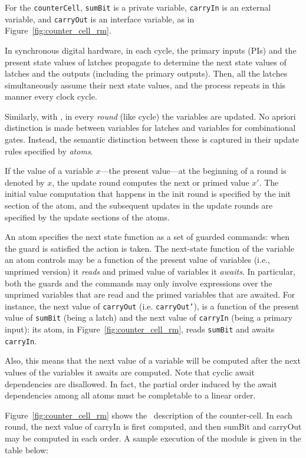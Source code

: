 For the {\tt counterCell}, {\tt sumBit} is a private variable, {\tt carryIn} is an
external variable, and {\tt carryOut} is an interface variable, as in Figure~\ref{fig:counter_cell_rm}. 

In synchronous digital hardware, in each cycle, the primary inputs
(PIs) and the present state values of latches propagate to determine
the next state values of latches and the outputs (including the
primary outputs). Then, all the latches simultaneously assume their
next state values, and the process repeats in this manner every clock cycle. 

Similarly, with \rem, in every {\em round} (like cycle) the variables
are updated. No apriori distinction is made between variables for
latches and variables for combinational gates. Instead, the semantic
distinction between these is captured in their update rules specified
by {\em atoms}. 

If the value of a variable $x$---the present value---at the beginning
of a round is denoted by $x$, the update round computes the next or
primed value $x'$. The initial value computation that happens in the
init round is specified by the init section of the atom, and the
subsequent updates in the update rounds are specified by the update
sections of the atoms.

An atom specifies the next state function as a set of guarded
commands: when the guard is satisfied the action is taken.  The
next-state function of the variable an atom controls may be a function
of the present value of variables (i.e., unprimed version) it {\em
reads} and primed value of variables it {\em awaits}. In particular,
both the guards and the commands may only involve expressions over the
unprimed variables that are read and the primed variables that are
awaited.  For instance, the next value of {\tt carryOut} (i.e. {\tt carryOut'}),
is a function of the present value of {\tt sumBit} (being a latch) and the
next value of {\tt carryIn} (being a primary input): its atom, in
Figure~\ref{fig:counter_cell_rm}, reads {\tt sumBit} and awaits {\tt
carryIn}. 

Also, this means that the next value of a variable will be computed
after the next values of the variables it awaits are computed.
Note that cyclic await dependencies are disallowed.
In fact, the partial order induced by the await dependencies among all atoms
must be completable to a linear order.

Figure~\ref{fig:counter_cell_rm} shows the \rem\ description of the
counter-cell. In each round, the next value of carryIn is first
computed, and then sumBit and carryOut may be computed in each order. 
A sample execution of the module is given in the table below:

